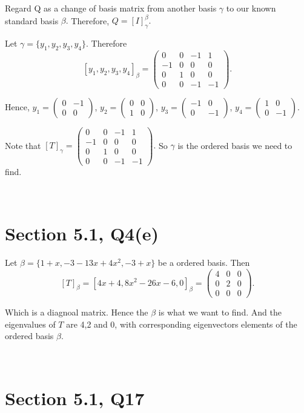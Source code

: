 \documentclass[12pt]{article}%
\begin{document}
Regard Q as a change of basis matrix from another basis $\gamma$ to our known standard basis $\beta.$ Therefore, $Q=[I]_{\gamma}^{\beta}.$

Let $\gamma=\{y_1,y_2,y_3,y_4\}.$ Therefore $$[y_1,y_2,y_3,y_4]_\beta =\begin{pmatrix}0&0&-1&1\\-1&0&0&0\\0&1&0&0\\0&0&-1&-1\end{pmatrix}. $$

Hence, $y_1 = \begin{pmatrix} 0&-1\\0&0\end{pmatrix}$, $y_2 = \begin{pmatrix}0&0\\1&0\end{pmatrix}$, $y_3 = \begin{pmatrix} -1&0\\0&-1\end{pmatrix}$, $y_4 = \begin{pmatrix} 1&0\\0&-1\end{pmatrix}.$

Note that $[T]_\gamma=\begin{pmatrix}0&0&-1&1\\-1&0&0&0\\0&1&0&0\\0&0&-1&-1\end{pmatrix}.$ So $\gamma$ is the ordered basis we need to find.

~\ 

\section{Section 5.1, Q4(e)}

Let $\beta = \{1+x, -3-13x+4x^2, -3+x\}$ be a ordered basis. Then $$[T]_\beta=[4x+4,8x^2-26x-6,0]_\beta=\begin{pmatrix}4&0&0\\0&2&0\\0&0&0\end{pmatrix}.$$

Which is a diagnoal matrix. Hence the $\beta$ is what we want to find. And the eigenvalues of $T$ are 4,2 and 0, with corresponding eigenvectors elements of the ordered basis $\beta.$

~\ 

\section{Section 5.1, Q17}
\end{document}
